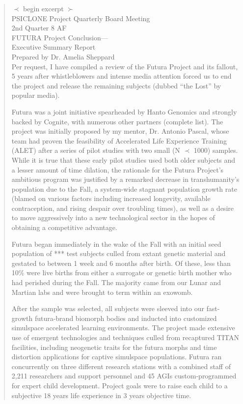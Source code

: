\begin{quotation}
$\prec$ begin excerpt $\succ$ \\
PSICLONE Project Quarterly Board Meeting \\
2nd Quarter 8 AF \\
FUTURA Project Conclusion—  \\
Executive Summary Report \\
Prepared by Dr. Amelia Sheppard	
\\
Per request, I have compiled a review of the
Futura Project and its fallout, 5 years after
whistleblowers and intense media attention
forced us to end the project and release the
remaining subjects (dubbed “the Lost” by
popular media).

Futura was a joint initiative spearheaded by
Hanto Genomics and strongly backed by Cognite,
with numerous other partners (complete
list). The project was initially proposed by my
mentor, Dr. Antonio Pascal, whose team had
proven the feasibility of Accelerated Life Experience
Training (ALET) after a series of pilot
studies with two small (N $ \prec $ 1000) samples.
While it is true that these early pilot studies
used both older subjects and a lesser amount
of time dilation, the rationale for the Futura
Project’s ambitious program was justified by a
remarked decrease in transhumanity’s population
due to the Fall, a system-wide stagnant
population growth rate (blamed on various
factors including increased longevity, available
contraception, and rising despair over troubling
times), as well as a desire to move aggressively
into a new technological sector in the hopes of
obtaining a competitive advantage.

Futura began immediately in the wake
of the Fall with an initial seed population
of *** test subjects culled from extant genetic
material and gestated to between 1 week and
6 months after birth. Of these, less than 10\%
were live births from either a surrogate or
genetic birth mother who had perished during
the Fall. The majority came from our Lunar and
Martian labs and were brought to term within
an exowomb.

After the sample was selected, all subjects
were sleeved into our fast-growth futura-brand
biomorph bodies and inducted into customized
simulspace accelerated learning environments.
The project made extensive use of emergent
technologies and techniques culled from recaptured
TITAN facilities, including neogenetic
traits for the futura morphs and time distortion
applications for captive simulspace populations.
Futura ran concurrently on three different
research stations with a combined staff of
2,211 researchers and support personnel and
45 AGIs custom-programmed for expert child
development. Project goals were to raise each
child to a subjective 18 years life experience in
3 years objective time.


\end{quotation}
